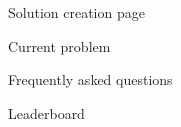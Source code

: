 \documentclass{report}
\begin{document}
\begin{figure}
\caption{Solution creation page}
\end{figure}

\begin{figure}
\caption{Current problem}
\end{figure}

\begin{figure}
\caption{Frequently asked questions}
\end{figure}

\begin{figure}
\caption{Leaderboard}
\end{figure}
\end{document}
